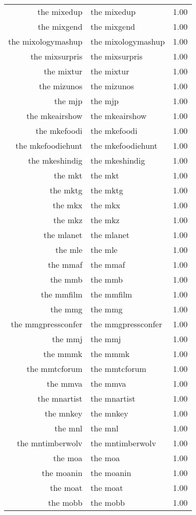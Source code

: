 \begin{table}[ht]
\begin{tabular}{rlr}
  the mixedup & the mixedup & 1.00 \\ 
  the mixgend & the mixgend & 1.00 \\ 
  the mixologymashup & the mixologymashup & 1.00 \\ 
  the mixsurpris & the mixsurpris & 1.00 \\ 
  the mixtur & the mixtur & 1.00 \\ 
  the mizunos & the mizunos & 1.00 \\ 
  the mjp & the mjp & 1.00 \\ 
  the mkeairshow & the mkeairshow & 1.00 \\ 
  the mkefoodi & the mkefoodi & 1.00 \\ 
  the mkefoodiehunt & the mkefoodiehunt & 1.00 \\ 
  the mkeshindig & the mkeshindig & 1.00 \\ 
  the mkt & the mkt & 1.00 \\ 
  the mktg & the mktg & 1.00 \\ 
  the mkx & the mkx & 1.00 \\ 
  the mkz & the mkz & 1.00 \\ 
  the mlanet & the mlanet & 1.00 \\ 
  the mle & the mle & 1.00 \\ 
  the mmaf & the mmaf & 1.00 \\ 
  the mmb & the mmb & 1.00 \\ 
  the mmfilm & the mmfilm & 1.00 \\ 
  the mmg & the mmg & 1.00 \\ 
  the mmgpressconfer & the mmgpressconfer & 1.00 \\ 
  the mmj & the mmj & 1.00 \\ 
  the mmmk & the mmmk & 1.00 \\ 
  the mmtcforum & the mmtcforum & 1.00 \\ 
  the mmva & the mmva & 1.00 \\ 
  the mnartist & the mnartist & 1.00 \\ 
  the mnkey & the mnkey & 1.00 \\ 
  the mnl & the mnl & 1.00 \\ 
  the mntimberwolv & the mntimberwolv & 1.00 \\ 
  the moa & the moa & 1.00 \\ 
  the moanin & the moanin & 1.00 \\ 
  the moat & the moat & 1.00 \\ 
  the mobb & the mobb & 1.00 \\ 

\end{tabular}
\end{table}
